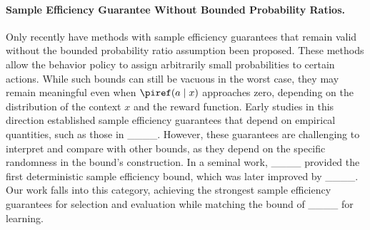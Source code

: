 %


\paragraph{Sample Efficiency Guarantee Without Bounded Probability Ratios.}
Only recently have methods with sample efficiency guarantees that remain valid without the bounded probability ratio assumption been proposed. These methods allow the behavior policy to assign arbitrarily small probabilities to certain actions.
While such bounds can still be vacuous in the worst case, they may remain meaningful even when $\piref(a\mid x)$ approaches zero, depending on the distribution of the context $x$ and the reward function.
Early studies in this direction established sample efficiency guarantees that depend on empirical quantities, such as those in ____. However, these guarantees are challenging to interpret and compare with other bounds, as they depend on the specific randomness in the bound’s construction.
In a seminal work, ____ provided the first deterministic sample efficiency bound, which was later improved by ____.
Our work falls into this category, achieving the strongest sample efficiency guarantees for selection and evaluation while matching the bound of ____ for learning.